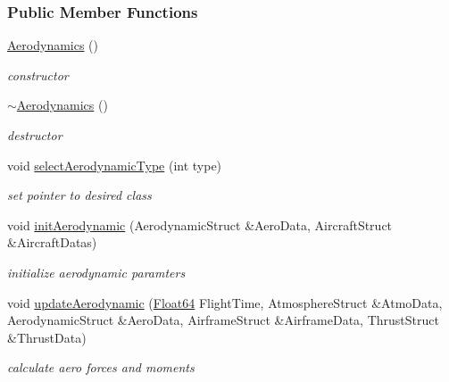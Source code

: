 \subsubsection*{Public Member Functions}
\begin{DoxyCompactItemize}
\item 
\mbox{\label{group___aerodynamic_a36c7ae850ce18605cdbf3ce1709d8e54}} 
\hyperlink{group___aerodynamic_a36c7ae850ce18605cdbf3ce1709d8e54}{Aerodynamics} ()
\begin{DoxyCompactList}\small\item\em constructor \end{DoxyCompactList}\item 
\mbox{\label{group___aerodynamic_af0e048e0c80ec8334997b79b761fea60}} 
\hyperlink{group___aerodynamic_af0e048e0c80ec8334997b79b761fea60}{$\sim$\+Aerodynamics} ()
\begin{DoxyCompactList}\small\item\em destructor \end{DoxyCompactList}\item 
\mbox{\label{group___aerodynamic_a9aa3397e8b1d91ed237146a57bbe6bcf}} 
void \hyperlink{group___aerodynamic_a9aa3397e8b1d91ed237146a57bbe6bcf}{select\+Aerodynamic\+Type} (int type)
\begin{DoxyCompactList}\small\item\em set pointer to desired class \end{DoxyCompactList}\item 
\mbox{\label{group___aerodynamic_aa4fee96e5b485cac47b3bc2127a6d4e2}} 
void \hyperlink{group___aerodynamic_aa4fee96e5b485cac47b3bc2127a6d4e2}{init\+Aerodynamic} (Aerodynamic\+Struct \&Aero\+Data, Aircraft\+Struct \&Aircraft\+Datas)
\begin{DoxyCompactList}\small\item\em initialize aerodynamic paramters \end{DoxyCompactList}\item 
\mbox{\label{group___aerodynamic_adf6047b063022ff3b689e269d2b35863}} 
void \hyperlink{group___aerodynamic_adf6047b063022ff3b689e269d2b35863}{update\+Aerodynamic} (\hyperlink{group___tools_ga3f1431cb9f76da10f59246d1d743dc2c}{Float64} Flight\+Time, Atmosphere\+Struct \&Atmo\+Data, Aerodynamic\+Struct \&Aero\+Data, Airframe\+Struct \&Airframe\+Data, Thrust\+Struct \&Thrust\+Data)
\begin{DoxyCompactList}\small\item\em calculate aero forces and moments \end{DoxyCompactList}\end{DoxyCompactItemize}
\label{class_base_aerodynamic}
